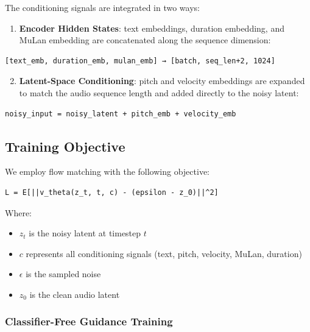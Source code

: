 \documentclass[11pt,a4paper]{article}
\begin{document}
The conditioning signals are integrated in two ways:

\begin{enumerate}[leftmargin=1.5em]
    \item \textbf{Encoder Hidden States}: text embeddings, duration embedding, and MuLan embedding are concatenated along the sequence dimension:
\end{enumerate}

\begin{verbatim}
[text_emb, duration_emb, mulan_emb] → [batch, seq_len+2, 1024]
\end{verbatim}

\begin{enumerate}[leftmargin=1.5em]
    \setcounter{enumi}{1}
    \item \textbf{Latent-Space Conditioning}: pitch and velocity embeddings are expanded to match the audio sequence length and added directly to the noisy latent:
\end{enumerate}

\begin{verbatim}
noisy_input = noisy_latent + pitch_emb + velocity_emb
\end{verbatim}

\subsection{Training Objective}

We employ flow matching with the following objective:

\begin{verbatim}
L = E[||v_theta(z_t, t, c) - (epsilon - z_0)||^2]
\end{verbatim}

Where:
\begin{itemize}[leftmargin=1.5em]
    \item $z_t$ is the noisy latent at timestep $t$
    \item $c$ represents all conditioning signals (text, pitch, velocity, MuLan, duration)
    \item $\epsilon$ is the sampled noise
    \item $z_0$ is the clean audio latent
\end{itemize}

\subsubsection{Classifier-Free Guidance Training}
\end{document}
